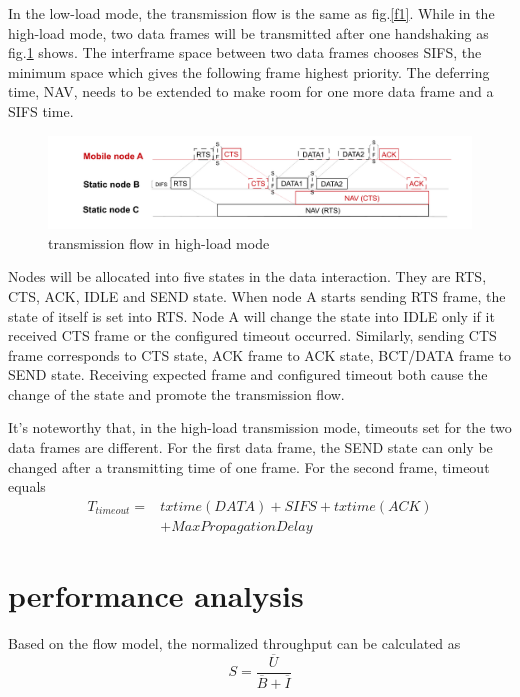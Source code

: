 \documentclass[conference]{IEEEtran}
\begin{document}
In the low-load mode, the transmission flow is the same as fig.\ref{f1}. While in the high-load mode, two data frames will be transmitted after one handshaking as fig.\ref{ll} shows. The interframe space between two data frames chooses SIFS, the minimum space which gives the following frame highest priority. The deferring time, NAV, needs to be extended to make room for one more data frame and a SIFS time. 
\begin{figure}[ht]
	\centerline{\includegraphics[scale=0.12]{figures/2.pdf}}
	\caption{transmission flow in high-load mode}
	\label{ll}
\end{figure}


Nodes will be allocated into five states in the data interaction. They are RTS, CTS, ACK, IDLE and SEND state. When node A starts sending RTS frame, the state of itself is set into RTS. Node A will change the state into IDLE only if it received CTS frame or the configured timeout occurred. Similarly, sending CTS frame corresponds to CTS state, ACK frame to ACK state, BCT/DATA frame to SEND state. Receiving expected frame and configured timeout both cause the change of the state and promote the transmission flow.

It's noteworthy that, in the high-load transmission mode, timeouts set for the two data frames are different. For the first data frame, the SEND state can only be changed after a transmitting time of one frame. For the second frame, timeout equals
\begin{equation*}
\begin{aligned}
T_{timeout}=&txtime(DATA)+SIFS+txtime(ACK)\\&+MaxPropagationDelay
\end{aligned}
\end{equation*}


\section{performance analysis}
Based on the flow model\cite{kleinrock1975packet}, the normalized throughput can be calculated as
\begin{equation}
S=\frac{\overline U}{\overline B+\overline I}
\label{11}
\end{equation}
\end{document}
